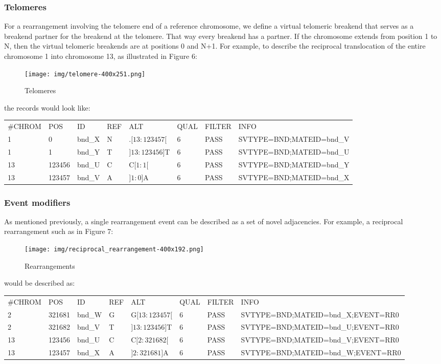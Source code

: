 \documentclass[8pt]{article}
\begin{document}
\subsubsection{Telomeres}
For a rearrangement involving the telomere end of a reference chromosome, we define a virtual telomeric breakend that serves as a breakend partner for the breakend at the telomere. That way every breakend has a partner. If the chromosome extends from position 1 to N, then the virtual telomeric breakends are at positions 0 and N+1. For example, to describe the reciprocal translocation of the entire chromosome 1 into chromosome 13, as illustrated in Figure 6:

\begin{figure}[h]
\centering
\texttt{[image: img/telomere-400x251.png]}
\caption{Telomeres}
\end{figure}

the records would look like:

\small
\begin{tabular}{ l l l l l l l l }
\#CHROM & POS & ID & REF & ALT & QUAL & FILTER & INFO \\
1 & 0 & bnd\_X & N & $.[13:123457[$ & 6 & PASS & SVTYPE=BND;MATEID=bnd\_V \\
1 & 1 & bnd\_Y & T & $]13:123456]$T & 6 & PASS & SVTYPE=BND;MATEID=bnd\_U \\
13 & 123456 & bnd\_U & C & C$[1:1[$ & 6 & PASS & SVTYPE=BND;MATEID=bnd\_Y \\
13 & 123457 & bnd\_V & A & $]1:0]$A & 6 & PASS & SVTYPE=BND;MATEID=bnd\_X \\
\end{tabular}
\normalsize

\subsubsection{Event modifiers}
As mentioned previously, a single rearrangement event can be described as a set of novel adjacencies. For example, a reciprocal rearrangement such as in Figure 7:

\begin{figure}[h]
\centering
\texttt{[image: img/reciprocal\_rearrangement-400x192.png]}
\caption{Rearrangements}
\end{figure}

would be described as:

\vspace{0.3cm}
\footnotesize
\begin{tabular}{ l l l l l l l l }
\#CHROM & POS & ID & REF & ALT & QUAL & FILTER & INFO \\
2 & 321681 & bnd\_W & G & G$[13:123457[$ & 6 & PASS & SVTYPE=BND;MATEID=bnd\_X;EVENT=RR0 \\
2 & 321682 & bnd\_V & T & $]13:123456]$T & 6 & PASS & SVTYPE=BND;MATEID=bnd\_U;EVENT=RR0 \\
13 & 123456 & bnd\_U & C & C$[2:321682[$ & 6 & PASS & SVTYPE=BND;MATEID=bnd\_V;EVENT=RR0 \\
13 & 123457 & bnd\_X & A & $]2:321681]$A & 6 & PASS & SVTYPE=BND;MATEID=bnd\_W;EVENT=RR0 \\
\end{tabular}
\normalsize
\end{document}
